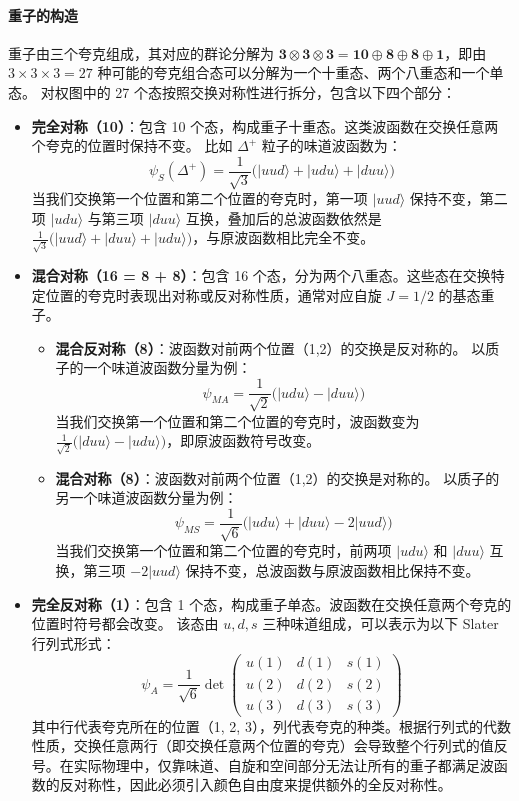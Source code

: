 \paragraph{重子的构造}
重子由三个夸克组成，其对应的群论分解为 $\mathbf{3} \otimes \mathbf{3} \otimes \mathbf{3} = \mathbf{10} \oplus \mathbf{8} \oplus \mathbf{8} \oplus \mathbf{1}$，即由 $3 \times 3 \times 3 = 27$ 种可能的夸克组合态可以分解为一个十重态、两个八重态和一个单态。
对权图中的 27 个态按照交换对称性进行拆分，包含以下四个部分：

\begin{itemize}
    \item \textbf{完全对称（10）}：包含 10 个态，构成重子十重态。这类波函数在交换任意两个夸克的位置时保持不变。
    比如 $\Delta^+$ 粒子的味道波函数为：
    $$\psi_S(\Delta^+) = \frac{1}{\sqrt{3}} \big( |uud\rangle + |udu\rangle + |duu\rangle \big)$$
    当我们交换第一个位置和第二个位置的夸克时，第一项 $|uud\rangle$ 保持不变，第二项 $|udu\rangle$ 与第三项 $|duu\rangle$ 互换，叠加后的总波函数依然是 $\frac{1}{\sqrt{3}} \big( |uud\rangle + |duu\rangle + |udu\rangle \big)$，与原波函数相比完全不变。

    \item \textbf{混合对称（16 = 8 + 8）}：包含 16 个态，分为两个八重态。这些态在交换特定位置的夸克时表现出对称或反对称性质，通常对应自旋 $J=1/2$ 的基态重子。
    \begin{itemize}
        \item \textbf{混合反对称（8）}：波函数对前两个位置（1,2）的交换是反对称的。
        以质子的一个味道波函数分量为例：
        $$\psi_{MA} = \frac{1}{\sqrt{2}} \big( |udu\rangle - |duu\rangle \big)$$
        当我们交换第一个位置和第二个位置的夸克时，波函数变为 $\frac{1}{\sqrt{2}} \big( |duu\rangle - |udu\rangle \big)$，即原波函数符号改变。
        \item \textbf{混合对称（8）}：波函数对前两个位置（1,2）的交换是对称的。
        以质子的另一个味道波函数分量为例：
        $$\psi_{MS} = \frac{1}{\sqrt{6}} \big( |udu\rangle + |duu\rangle - 2|uud\rangle \big)$$
        当我们交换第一个位置和第二个位置的夸克时，前两项 $|udu\rangle$ 和 $|duu\rangle$ 互换，第三项 $-2|uud\rangle$ 保持不变，总波函数与原波函数相比保持不变。
    \end{itemize}

    \item \textbf{完全反对称（1）}：包含 1 个态，构成重子单态。波函数在交换任意两个夸克的位置时符号都会改变。
    该态由 $u, d, s$ 三种味道组成，可以表示为以下 Slater 行列式形式：
    $$\psi_A = \frac{1}{\sqrt{6}} \det \begin{pmatrix} u(1) & d(1) & s(1) \\ u(2) & d(2) & s(2) \\ u(3) & d(3) & s(3) \end{pmatrix}$$
    其中行代表夸克所在的位置（1, 2, 3），列代表夸克的种类。根据行列式的代数性质，交换任意两行（即交换任意两个位置的夸克）会导致整个行列式的值反号。在实际物理中，仅靠味道、自旋和空间部分无法让所有的重子都满足波函数的反对称性，因此必须引入颜色自由度来提供额外的全反对称性。
\end{itemize}
